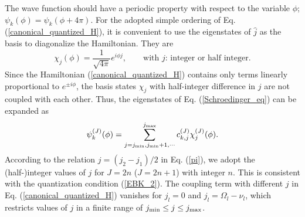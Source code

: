 \documentclass[11pt]{book} %
\begin{document}
The wave function should have a periodic property with respect to
the variable $\phi$;
$\psi_k(\phi)=\psi_k(\phi+4\pi)$.
For the adopted simple ordering of Eq. (\ref{canonical_quantized_H}),
it is convenient to use the eigenstates of $\hat{j}$ as the basis
to diagonalize the Hamiltonian.
They are
\begin{equation}
	\chi_j(\phi) = \frac{1}{\sqrt{4\pi}} e^{i\phi j} ,
	\quad\quad\mbox{with $j$: integer or half integer} .
\end{equation}
Since the Hamiltonian (\ref{canonical_quantized_H}) contains only
terms linearly proportional to $e^{\pm i\phi}$,
the basis states $\chi_j$ with half-integer difference in $j$
are not coupled with each other.
Thus, the eigenstates of Eq. (\ref{Schroedinger_eq}) can be expanded as
\begin{equation}
	\psi_k^{(J)}(\phi) = 
	\sum_{j=j_{\rm min},j_{\rm min}+1,\cdots}^{j_{\rm max}}
	c_{k,j}^{(J)} \chi_j^{(J)}(\phi) .
	\label{CQ_eigenstate}
\end{equation}
According to the relation $j=(j_2-j_1)/2$ in Eq. (\ref{pi}),
we adopt the (half-)integer values of $j$ for $J=2n$ ($J=2n+1$)
with integer $n$.
This is consistent with the quantization condition (\ref{EBK_2}).
The coupling term with different $j$
in Eq. (\ref{canonical_quantized_H}) vanishes
for $j_l=0$ and $j_l=\Omega_l-\nu_l$,
which restricts values of $j$ in a finite range of
$j_{\rm min}\leq j \leq j_{\rm max}$.
\end{document}
